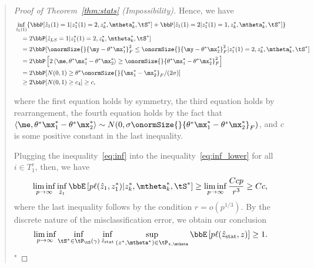 \documentclass[11pt]{article}
\theoremstyle{definition}
\theoremstyle{definition}
\newcommand{\off}[1]{\left[#1\right]}
\newcommand{\ang}[1]{\left\langle#1\right\rangle}
\begin{document}
\begin{enumerate}
\begin{enumerate}[wide]
\begin{quote}
\begin{proof}[Proof of Theorem~\ref{thm:stats} (Impossibility)]
   
   Hence, we have 
   \begin{align}
       & \inf_{\hat z_1(1)} \{ \bbP[\hat z_1(1) = 1| z_1^*(1) = 2, z^*_k,  \mtheta_k^*, \tS^*] +   \bbP[\hat z_1(1) = 2| z_1^*(1) = 1, z^*_k,  \mtheta_k^*, \tS^*] \} \\
       & \quad = 2 \bbP[ \hat z_{LS} = 1 |  z_1^*(1) = 2, z^*_k,  \mtheta_k^*, \tS^* ] \\
      & \quad  = 2 \bbP[ \onormSize{}{\my - \theta^* \mx_1^*}_F^2 \leq \onormSize{}{\my - \theta^* \mx_2^*}_F^2 | z_1^*(1) = 2, z^*_k , \mtheta_k^*, \tS^*   ] \\
      & \quad = 2 \bbP \off{ 2 \ang{\me, \theta^* \mx_1^* - \theta^*\mx_2^* } \geq  \onormSize{}{\theta^* \mx_1^* - \theta^*\mx_2^*}_F^2 }\\
       & \quad =  2 \bbP[ N(0,1) \geq \theta^* \onormSize{}{\mx_1^* - \mx_2^*}_F /(2\sigma) ] \\
       & \quad \geq 2 \bbP[ N(0,1) \geq c_4 ]   \geq c,
   \end{align}

where the first equation holds by symmetry, the third equation holds by rearrangement, the fourth equation holds by the fact that $\ang{\me, \theta^* \mx_1^* - \theta^*\mx_2^* } \sim N(0, \sigma \onormSize{}{\theta^* \mx_1^* - \theta^*\mx_2^*}_F)$, and $c$ is some positive constant in the last inequality.
   
   Plugging the inequality~\eqref{eq:inf} into the inequality~\eqref{eq:inf_lower} for all $i \in T_1^c$, then, we have 
   \begin{equation}
       \liminf_{p \rightarrow \infty}  \inf_{\hat z_1 } \bbE \left[ p \ell(\hat z_1, z_1^*) | z^*_k, \mtheta^*_k, \tS^*  \right]  \geq \liminf_{p \rightarrow \infty} \frac{ C cp }{r^3} \geq C c,
   \end{equation}
   where the last inequality follows by the condition $r = o(p^{1/3})$. By the discrete nature of the misclassification error, we obtain our conclusion
   \begin{equation}
       \liminf_{p \rightarrow \infty} \inf_{\tS^* \in  \tP_{\tS}(\gamma)}  \inf_{\hat z_{\text{stat}} }\sup_{ (z^*, \mtheta^*) \in \tP_{z, \mtheta}} \bbE \left[ p\ell(\hat z_{\text{stat}}, z) \right]  \geq 1. 
   \end{equation}
"
   \end{proof}
    \end{quote}


\end{enumerate}
\end{enumerate}
\end{document}
